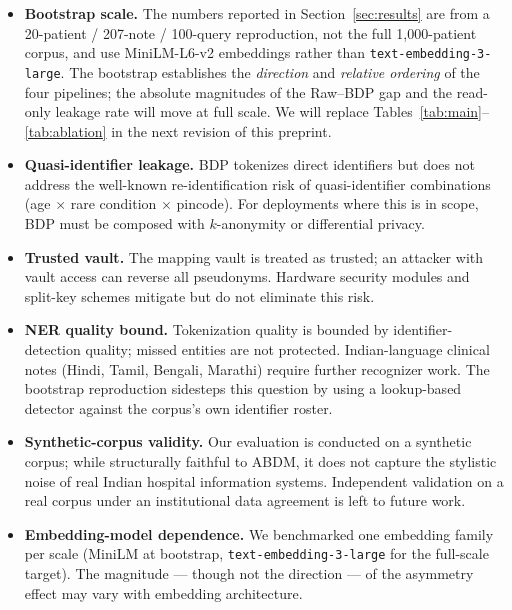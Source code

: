 \documentclass[11pt,a4paper]{article}
\begin{document}
\begin{itemize}
  \item \textbf{Bootstrap scale.} The numbers reported in
        Section~\ref{sec:results} are from a 20-patient / 207-note /
        100-query reproduction, not the full 1{,}000-patient corpus, and
        use MiniLM-L6-v2 embeddings rather than
        \texttt{text-embedding-3-large}. The bootstrap establishes the
        \emph{direction} and \emph{relative ordering} of the four pipelines;
        the absolute magnitudes of the Raw--BDP gap and the read-only
        leakage rate will move at full scale. We will replace
        Tables~\ref{tab:main}--\ref{tab:ablation} in the next revision of
        this preprint.
  \item \textbf{Quasi-identifier leakage.} BDP tokenizes direct identifiers
        but does not address the well-known re-identification risk of
        quasi-identifier combinations (age $\times$ rare condition $\times$
        pincode). For deployments where this is in scope, BDP must be
        composed with $k$-anonymity or differential privacy.
  \item \textbf{Trusted vault.} The mapping vault is treated as trusted; an
        attacker with vault access can reverse all pseudonyms. Hardware
        security modules and split-key schemes mitigate but do not eliminate
        this risk.
  \item \textbf{NER quality bound.} Tokenization quality is bounded by
        identifier-detection quality; missed entities are not protected.
        Indian-language clinical notes (Hindi, Tamil, Bengali, Marathi)
        require further recognizer work. The bootstrap reproduction
        sidesteps this question by using a lookup-based detector against
        the corpus's own identifier roster.
  \item \textbf{Synthetic-corpus validity.} Our evaluation is conducted on
        a synthetic corpus; while structurally faithful to ABDM, it does
        not capture the stylistic noise of real Indian hospital information
        systems. Independent validation on a real corpus under an
        institutional data agreement is left to future work.
  \item \textbf{Embedding-model dependence.} We benchmarked one embedding
        family per scale (MiniLM at bootstrap, \texttt{text-embedding-3-large}
        for the full-scale target). The magnitude --- though not the
        direction --- of the asymmetry effect may vary with embedding
        architecture.
\end{itemize}
\end{document}
